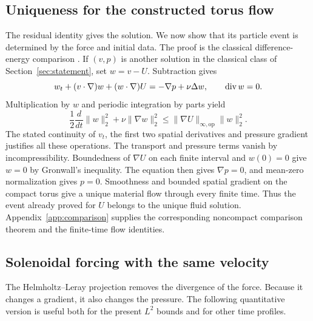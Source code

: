 \subsection{Uniqueness for the constructed torus flow}
The residual identity gives the solution. We now show that its particle
event is determined by the force and initial data. The proof is the
classical difference-energy comparison \cite[Section~18]{Leray}.
If $(v,p)$ is another solution in the classical class of
Section~\ref{sec:statement}, set $w=v-U$. Subtraction gives
\[
 w_t+(v\cdot\nabla)w+(w\cdot\nabla)U
  =-\nabla p+\nu\Delta w,\qquad \operatorname{div} w=0.
\]
Multiplication by $w$ and periodic integration by parts yield
\[
 \frac12\frac{d}{dt}\|w\|_2^2+\nu\|\nabla w\|_2^2
 \leq\|\nabla U\|_{\infty,\mathrm{op}}\|w\|_2^2.
\]
The stated continuity of $v_t$, the first two spatial derivatives and
pressure gradient justifies all these operations. The transport and
pressure terms vanish by incompressibility. Boundedness of $\nabla U$
on each finite interval and $w(0)=0$ give $w=0$ by Gronwall's
inequality. The equation then gives $\nabla p=0$, and mean-zero
normalization gives $p=0$. Smoothness and bounded spatial gradient on
the compact torus give a unique material flow through every finite
time. Thus the event already proved for $U$ belongs to the unique
fluid solution. Appendix~\ref{app:comparison} supplies the corresponding
noncompact comparison theorem and the finite-time flow identities.

\subsection{Solenoidal forcing with the same velocity}
The Helmholtz--Leray projection removes the divergence of the force.
Because it changes a gradient, it also changes the pressure. The
following quantitative version is useful both for the present
$L^2$ bounds and for other time profiles.

